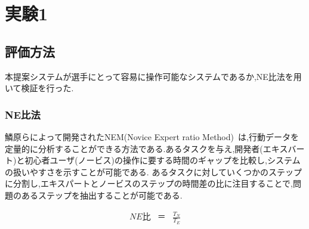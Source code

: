 \documentclass[sotsuron]{kuee}
\begin{document}
	\section{実験1}
		\subsection{評価方法}
			本提案システムが選手にとって容易に操作可能なシステムであるか,NE比法を用いて検証を行った.
				\subsubsection{NE比法}
					鱗原らによって開発されたNEM(Novice Expert ratio Method)~\cite{NEM}は,行動データを定量的に分析することができる方法である.あるタスクを与え,開発者(エキスバート)と初心者ユーザ(ノービス)の操作に要する時間のギャップを比較し,システムの扱いやすさを示すことが可能である.
					あるタスクに対していくつかのステップに分割し,エキスパートとノービスのステップの時間差の比に注目することで,問題のあるステップを抽出することが可能である.

					\begin{eqnarray}
						NE比 & ＝ & \frac{T_N}{T_E}
					\end{eqnarray}
					
\end{document}
